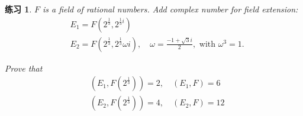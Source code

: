 \documentclass[utf8]{ctexbook}
\newtheorem{exercise}{练习}[section]
\begin{document}
\begin{exercise}
$F$ is a field of rational numbers. Add complex number for field extension:
\begin{align*}
& E_1 = F(2^{\frac{1}{3}}, 2^{\frac{1}{3} i}) \\
& E_2 = F(2^{\frac{1}{3}}, 2^{\frac{1}{3}} \omega i), \quad \omega = \frac{-1 + \sqrt{3} i}{2}, \mbox{ with } \omega^3 = 1 .
\end{align*}

Prove that
\begin{align*}
& (E_1, F(2^{\frac{1}{3}}) ) = 2, \quad (E_1, F) = 6 \\
& (E_2, F(2^{\frac{1}{3}}) ) = 4, \quad (E_2, F) = 12
\end{align*}


\end{exercise}
\end{document}
